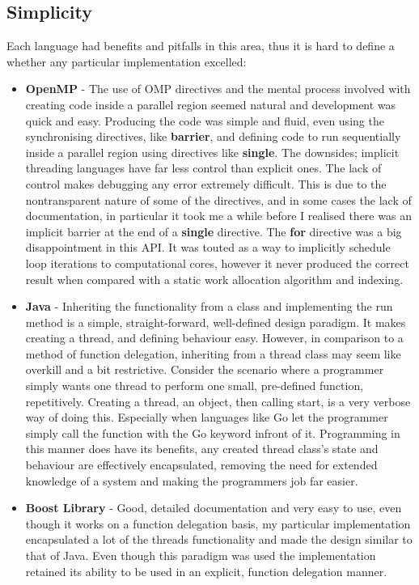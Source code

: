 \documentclass[11pt]{article} %
\begin{document}
\subsection{Simplicity}
Each language had benefits and pitfalls in this area, thus it is hard to define a whether any particular implementation excelled:
\begin{itemize}
\item {\bf OpenMP} - The use of OMP directives and the mental process involved with creating code inside a parallel region seemed natural and development was quick and easy. Producing the code was simple and fluid, even using the synchronising directives, like {\bf barrier}, and defining code to run sequentially inside a parallel region using directives like {\bf single}. The downsides; implicit threading languages have far less control than explicit ones. The lack of control makes debugging any error extremely difficult. This is due to the nontransparent nature of some of the directives, and in some cases the lack of documentation, in particular it took me a while before I realised there was an implicit barrier at the end of a {\bf single} directive. The {\bf for} directive was a big disappointment in this API. It was touted as a way to implicitly schedule loop iterations to computational cores, however it never produced the correct result when compared with a static work allocation algorithm and indexing.
\item {\bf Java} - Inheriting the functionality from a class and implementing the run method is a simple, straight-forward, well-defined design paradigm. It makes creating a thread, and defining behaviour easy. However, in comparison to a method of function delegation, inheriting from a thread class may seem like overkill and a bit restrictive. Consider the scenario where a programmer simply wants one thread to perform one small, pre-defined function, repetitively. Creating a thread, an object, then calling start, is a very verbose way of doing this. Especially when languages like Go let the programmer simply call the function with the Go keyword infront of it. Programming in this manner does have its benefits, any created thread class's state and behaviour are effectively encapsulated, removing the need for extended knowledge of a system and making the programmers job far easier.
\item {\bf Boost Library}  - Good, detailed documentation and very easy to use, even though it works on a function delegation basis, my particular implementation encapsulated a lot of the threads functionality and made the design similar to that of Java. Even though this paradigm was used the implementation retained its ability to be used in an explicit, function delegation manner.

\end{itemize}
\end{document}
